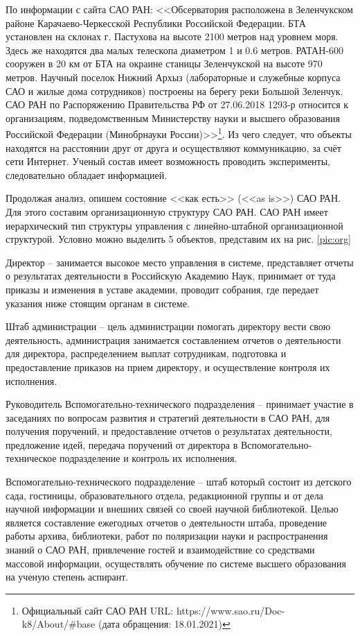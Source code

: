 По информации с сайта САО РАН: <<Обсерватория расположена в Зеленчукском районе Карачаево-Черкесской Республики Российской Федерации. БТА установлен на склонах г. Пастухова на высоте 2100 метров над уровнем моря. Здесь же находятся два малых телескопа диаметром 1 и 0.6 метров. РАТАН-600 сооружен в 20 км от БТА на окраине станицы Зеленчукской на высоте 970 метров. Научный поселок Нижний Архыз (лабораторные и служебные корпуса САО и жилые дома сотрудников) построены на берегу реки Большой Зеленчук. САО РАН по Распоряжению Правительства РФ от 27.06.2018 1293-р относится к организациям, подведомственным Министерству науки и высшего образования Российской Федерации (Минобрнауки России)>>\footnote{Официальный сайт САО РАН URL: https://www.sao.ru/Doc-k8/About/#base (дата обращения: 18.01.2021)}. Из чего следует, что объекты находятся на расстоянии друг от друга и осуществляют коммуникацию, за счёт сети Интернет. Ученый состав имеет возможность проводить эксперименты, следовательно обладает информацией. 

 

Продолжая анализ, опишем состояние <<как есть>> (<<as is>>) САО РАН. Для этого составим организационную структуру САО РАН. САО РАН имеет иерархический тип структуры управления с линейно-штабной организационной структурой. Условно можно выделить 5 объектов, представим их  на рис. \ref{pic:org}

Директор -- занимается высокое место управления в системе, представляет отчеты о результатах деятельности в Российскую Академию Наук, принимает от туда приказы и изменения в уставе академии, проводит собрания, где передает указания ниже стоящим органам в системе.
  
Штаб администрации -- цель администрации помогать директору вести свою деятельность, администрация занимается составлением отчетов о деятельности для директора, распределением выплат сотрудникам, подготовка и предоставление приказов на прием директору, и осуществление контроля их исполнения.

Руководитель Вспомогательно-технического подразделения -- принимает участие в заседаниях по вопросам развития и стратегий деятельности в САО РАН, для получения поручений, и предоставление отчетов о результатах деятельности, предложение идей, передача поручений от директора в Вспомогательно-техническое подразделение и контроль их исполнения. 

Вспомогательно-технического подразделение -- штаб который состоит из детского сада, гостиницы, образовательного отдела, редакционной группы и от дела научной информации и внешних связей со своей научной библиотекой. Целью является составление ежегодных отчетов о деятельности штаба, проведение работы архива, библиотеки, работ по поляризации науки и распространения знаний о САО РАН, привлечение гостей и взаимодействие со средствами массовой информации, осуществлять обучение по системе высшего образования на ученую степень аспирант. 

